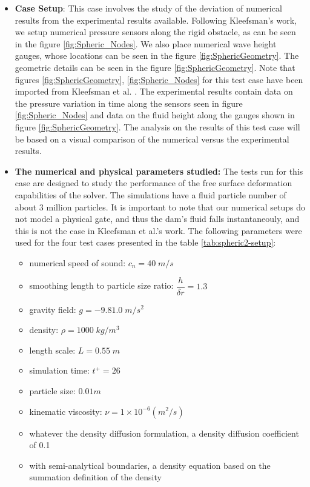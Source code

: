 \documentclass{../GPUSPHtemplate}
\begin{document}
\begin{itemize}
\item \textbf{Case Setup}: This case involves the study of the deviation of numerical results from the experimental results available.
  Following Kleefsman's work, we setup numerical pressure sensors along the rigid obstacle, as can be seen in the figure \ref{fig:Spheric_Nodes}.
  We also place numerical wave height gauges, whose locations can be seen in the figure \ref{fig:SphericGeometry}.
  The geometric details can be seen in the figure \ref{fig:SphericGeometry}. Note that figures \ref{fig:SphericGeometry},
  \ref{fig:Spheric_Nodes} for this test case have been imported from Kleefsman et al. \citep{Kleefsman}.
  The experimental results contain data on the pressure variation in time along the sensors seen in figure \ref{fig:Spheric_Nodes}
  and data on the fluid height along the gauges shown in figure \ref{fig:SphericGeometry}. The analysis on the results of this
  test case will be based on a visual comparison of the numerical versus the experimental results.    
  
\item \textbf{The numerical and physical parameters studied:} The tests run for this case are designed to study the performance
  of the free surface deformation capabilities of the solver. The simulations have a fluid particle number
  of about 3 million particles. It is important to note that our numerical
  setups do not model a physical gate, and thus the dam's fluid falls instantaneouly, and this is not the case in
  Kleefsman et al.'s work. The following parameters were used for the four test cases presented in the table \ref{tab:spheric2-setup}:   
  \begin{itemize}
  \item numerical speed of sound: ${c_n} = 40 \; m/s$
  \item smoothing length to particle size ratio: $\dfrac{h}{\delta r}=1.3$ 
  \item gravity field: $g = -9.81.0 \; {m}/{s^2}$
  \item density: $\rho = 1000 \; {kg}/{m^3} $
  \item length scale: $L = 0.55 \; m$
  \item simulation time: $t^+ = 26 $
  \item particle size: $0.01m$
  \item kinematic viscosity: $\nu = 1 \times 10^{-6} (m^2/s)$
  \item whatever the density diffusion formulation, a density diffusion coefficient of 0.1
  \item with semi-analytical boundaries, a density equation based on the summation definition of the density
  \end{itemize}
  

\end{itemize}
\end{document}

